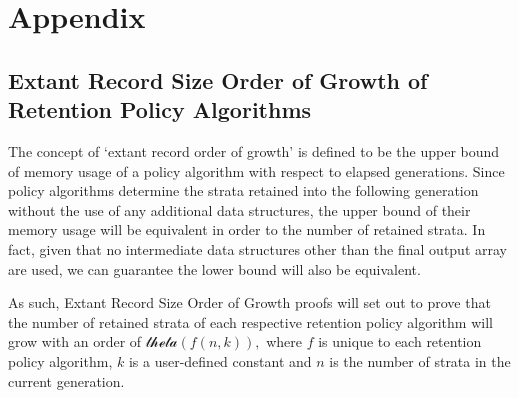 \section{Appendix}

\printunsrtglossary[numberedsection=autolabel]



\subsection{Extant Record Size Order of Growth of Retention Policy Algorithms} \label{sec:extant_record_oog}
The concept of `extant record order of growth' is defined to be the upper bound of memory usage of a policy algorithm with respect to elapsed generations.
Since policy algorithms determine the strata retained into the following generation without the use of any additional data structures, the upper bound of their memory usage will be equivalent in order to the number of retained strata.
In fact, given that no intermediate data structures other than the final output array are used, we can guarantee the lower bound will also be equivalent.

As such, Extant Record Size Order of Growth proofs will set out to prove that the number of retained strata of each respective retention policy algorithm will grow with an order of $\mathcal{theta}(f(n, k)),$ where $f$ is unique to each retention policy algorithm, $k$ is a user-defined constant and $n$ is the number of strata in the current generation.



